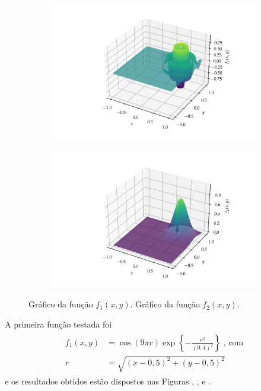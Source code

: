 \begin{figure}
    \begin{subfigure}{\textwidth}
        \centering
        \includegraphics[width=\textwidth]{imagens/graph_damped_cossine.png}
        \caption{}
        \label{fig:graph_damped_cossine}
    \end{subfigure}
    \begin{subfigure}{\textwidth}
        \centering
        \includegraphics[width=\textwidth]{imagens/graph_near_gaussians.png}
        \caption{}
        \label{fig:graph_near_gaussians}
    \end{subfigure}
    \caption{
         Gráfico da função $f_1(x,y)$.
         Gráfico da função $f_2(x,y)$.
    }
\end{figure}

A primeira função testada foi
\begin{align}
    \begin{split}    
        f_1(x,y) & = \cos(9\pi r)\exp\left\{-\frac{r^2}{(0,4)^2}\right\} \;\text{, com} \\
        r      & = \sqrt{
            \left(x - 0,5\right)^2 +
            \left(y - 0,5\right)^2
        }
    \end{split}
    \label{eq:func_damped_cossine}
\end{align}
e os resultados obtidos estão dispostos nas Figuras ,
,  e 
.

